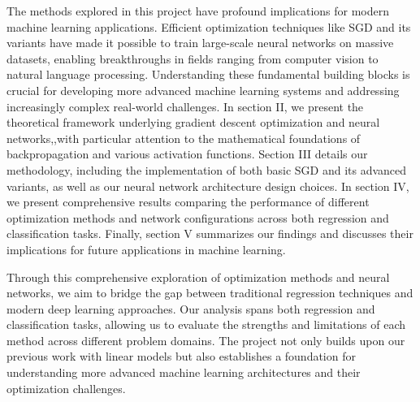 \documentclass[aps,pra,english,notitlepage,reprint,nofootinbib]{revtex4-1}  %
\begin{document}
The methods explored in this project have profound implications for modern machine learning applications. Efficient optimization techniques like SGD and its variants have made it possible to train large-scale neural networks on massive datasets, enabling breakthroughs in fields ranging from computer vision to natural language processing. Understanding these fundamental building blocks is crucial for developing more advanced machine learning systems and addressing increasingly complex real-world challenges. In section II, we present the theoretical framework underlying gradient descent optimization and neural networks,,with particular attention to the mathematical foundations of backpropagation and various activation functions. Section III details our methodology, including the implementation of both basic SGD and its advanced variants, as well as our neural network architecture design choices. In section IV, we present comprehensive results comparing the performance of different optimization methods and network configurations across both regression and classification tasks. Finally, section V summarizes our findings and discusses their implications for future applications in machine learning.

Through this comprehensive exploration of optimization methods and neural networks, we aim to bridge the gap between traditional regression techniques and modern deep learning approaches. Our analysis spans both regression and classification tasks, allowing us to evaluate the strengths and limitations of each method across different problem domains. The project not only builds upon our previous work with linear models but also establishes a foundation for understanding more advanced machine learning architectures and their optimization challenges.


\end{document}
